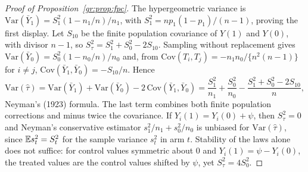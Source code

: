 \begin{proof}[Proof of Proposition~\ref{gr:prop:fpc}]
The hypergeometric variance is $\mathrm{Var}(\bar Y_1)=S_1^2(1-n_1/n)/n_1$, with $S_1^2=np_1(1-p_1)/(n-1)$, proving the first display. Let $S_{10}$ be the finite population covariance of $Y(1)$ and $Y(0)$, with divisor $n-1$, so $S_\tau^2=S_1^2+S_0^2-2S_{10}$. Sampling without replacement gives $\mathrm{Var}(\bar Y_0)=S_0^2(1-n_0/n)/n_0$ and, from $\mathrm{Cov}(T_i,T_j)=-n_1n_0/\{n^2(n-1)\}$ for $i\ne j$, $\mathrm{Cov}(\bar Y_1,\bar Y_0)=-S_{10}/n$. Hence
\[
\mathrm{Var}(\hat\tau)=\mathrm{Var}(\bar Y_1)+\mathrm{Var}(\bar Y_0)-2\,\mathrm{Cov}(\bar Y_1,\bar Y_0)=\frac{S_1^2}{n_1}+\frac{S_0^2}{n_0}-\frac{S_1^2+S_0^2-2S_{10}}{n},
\]
Neyman's (1923) formula. The last term combines both finite population corrections and minus twice the covariance. If $Y_i(1)=Y_i(0)+\psi$, then $S_\tau^2=0$ and Neyman's conservative estimator $s_1^2/n_1+s_0^2/n_0$ is unbiased for $\mathrm{Var}(\hat\tau)$, since $\mathbb{E} s_t^2=S_t^2$ for the sample variance $s_t^2$ in arm $t$. Stability of the laws alone does not suffice: for control values symmetric about 0 and $Y_i(1)=\psi-Y_i(0)$, the treated values are the control values shifted by $\psi$, yet $S_\tau^2=4S_0^2$.
\end{proof}

